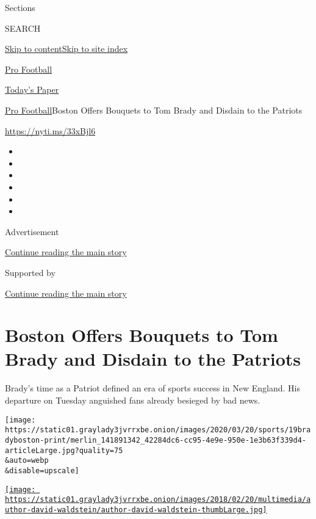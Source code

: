 Sections

SEARCH

\protect\hyperlink{site-content}{Skip to
content}\protect\hyperlink{site-index}{Skip to site index}

\href{https://www.nytimes3xbfgragh.onion/section/sports/football}{Pro
Football}

\href{https://myaccount.nytimes3xbfgragh.onion/auth/login?response_type=cookie\&client_id=vi}{}

\href{https://www.nytimes3xbfgragh.onion/section/todayspaper}{Today's
Paper}

\href{/section/sports/football}{Pro Football}\textbar{}Boston Offers
Bouquets to Tom Brady and Disdain to the Patriots

\url{https://nyti.ms/33xBjl6}

\begin{itemize}
\item
\item
\item
\item
\item
\item
\end{itemize}

Advertisement

\protect\hyperlink{after-top}{Continue reading the main story}

Supported by

\protect\hyperlink{after-sponsor}{Continue reading the main story}

\hypertarget{boston-offers-bouquets-to-tom-brady-and-disdain-to-the-patriots}{%
\section{Boston Offers Bouquets to Tom Brady and Disdain to the
Patriots}\label{boston-offers-bouquets-to-tom-brady-and-disdain-to-the-patriots}}

Brady's time as a Patriot defined an era of sports success in New
England. His departure on Tuesday anguished fans already besieged by bad
news.

\texttt{[image: https://static01.graylady3jvrrxbe.onion/images/2020/03/20/sports/19bradyboston-print/merlin\_141891342\_42284dc6-cc95-4e9e-950e-1e3b63f339d4-articleLarge.jpg?quality=75\\\&auto=webp\\\&disable=upscale]}

\href{https://www.nytimes3xbfgragh.onion/by/david-waldstein}{\texttt{[image: https://static01.graylady3jvrrxbe.onion/images/2018/02/20/multimedia/author-david-waldstein/author-david-waldstein-thumbLarge.jpg]}}

